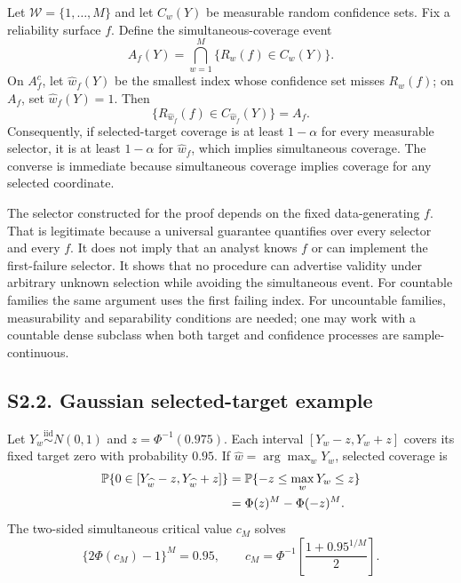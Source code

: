 Let $\mathcal W=\{1,\ldots,M\}$ and let $C_w(Y)$ be measurable random confidence sets. Fix a reliability surface $f$. Define the simultaneous-coverage event
\begin{equation}
A_f(Y)=\bigcap_{w=1}^M\{R_w(f)\in C_w(Y)\}.
\label{si:eq:allcoverage}
\end{equation}
On $A_f^c$, let $\widehat w_f(Y)$ be the smallest index whose confidence set misses $R_w(f)$; on $A_f$, set $\widehat w_f(Y)=1$. Then
\begin{equation}
\{R_{\widehat w_f}(f)\in C_{\widehat w_f}(Y)\}=A_f.
\label{si:eq:firstfailure}
\end{equation}
Consequently, if selected-target coverage is at least $1-\alpha$ for every measurable selector, it is at least $1-\alpha$ for $\widehat w_f$, which implies simultaneous coverage. The converse is immediate because simultaneous coverage implies coverage for any selected coordinate.

The selector constructed for the proof depends on the fixed data-generating $f$. That is legitimate because a universal guarantee quantifies over every selector and every $f$. It does not imply that an analyst knows $f$ or can implement the first-failure selector. It shows that no procedure can advertise validity under arbitrary unknown selection while avoiding the simultaneous event. For countable families the same argument uses the first failing index. For uncountable families, measurability and separability conditions are needed; one may work with a countable dense subclass when both target and confidence processes are sample-continuous.

\subsection*{S2.2. Gaussian selected-target example}

Let $Y_w\stackrel{\mathrm{iid}}\sim N(0,1)$ and $z=\Phi^{-1}(0.975)$. Each interval $[Y_w-z,Y_w+z]$ covers its fixed target zero with probability $0.95$. If $\widehat w=\arg\max_wY_w$, selected coverage is
\begin{align}
\mathbb{P}\{0\in[Y_{\widehat w}-z,Y_{\widehat w}+z]\}
&=\mathbb{P}\{-z\le\max_wY_w\le z\}\nonumber\\
&=\Phi(z)^M-\Phi(-z)^M.
\label{si:eq:selected-normal}
\end{align}
The two-sided simultaneous critical value $c_M$ solves
\begin{equation}
\{2\Phi(c_M)-1\}^M=0.95,
\qquad
c_M=\Phi^{-1}\!\left[\frac{1+0.95^{1/M}}2\right].
\label{si:eq:sim-critical}
\end{equation}

